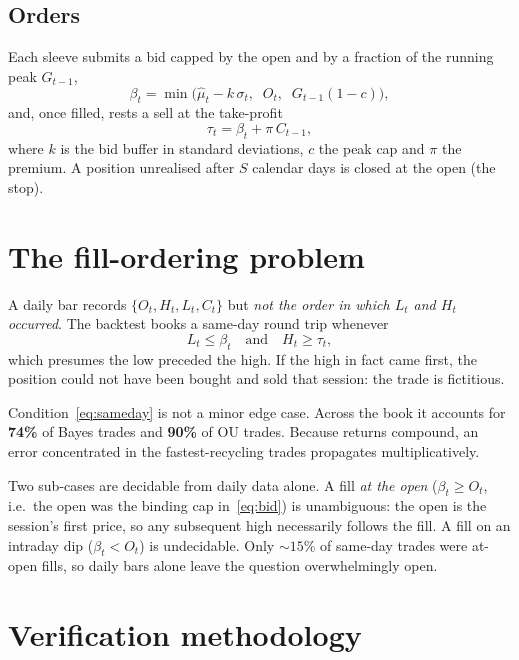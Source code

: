 \documentclass[11pt]{article}
\begin{document}
\subsection{Orders}

Each sleeve submits a bid capped by the open and by a fraction of the running peak $G_{t-1}$,
\begin{equation}
\beta_t=\min\!\Big(\hat{\mu}_t-k\,\sigma_t,\;\; O_t,\;\; G_{t-1}(1-c)\Big),
\label{eq:bid}
\end{equation}
and, once filled, rests a sell at the take-profit
\begin{equation}
\tau_t = \beta_t + \pi\,C_{t-1},
\label{eq:target}
\end{equation}
where $k$ is the bid buffer in standard deviations, $c$ the peak cap and $\pi$ the premium. A
position unrealised after $S$ calendar days is closed at the open (the stop).

\section{The fill-ordering problem}

A daily bar records $\{O_t,H_t,L_t,C_t\}$ but \emph{not the order in which $L_t$ and $H_t$
occurred}. The backtest books a same-day round trip whenever
\begin{equation}
L_t \le \beta_t \quad\text{and}\quad H_t \ge \tau_t ,
\label{eq:sameday}
\end{equation}
which presumes the low preceded the high. If the high in fact came first, the position could
not have been bought and sold that session: the trade is fictitious.

Condition~\eqref{eq:sameday} is not a minor edge case. Across the book it accounts for
\textbf{74\%} of Bayes trades and \textbf{90\%} of OU trades. Because returns compound, an
error concentrated in the fastest-recycling trades propagates multiplicatively.

Two sub-cases are decidable from daily data alone. A fill \emph{at the open}
($\beta_t \ge O_t$, i.e.\ the open was the binding cap in~\eqref{eq:bid}) is unambiguous: the
open is the session's first price, so any subsequent high necessarily follows the fill. A fill
on an intraday dip ($\beta_t<O_t$) is undecidable. Only $\sim\!15\%$ of same-day trades were
at-open fills, so daily bars alone leave the question overwhelmingly open.

\section{Verification methodology}
\end{document}
